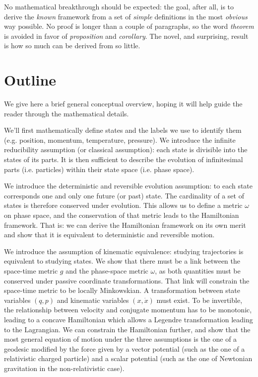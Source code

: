 \documentclass[aps,pra,10pt,twocolumn,floatfix,nofootinbib]{revtex4-1}
\theoremstyle{definition}
\begin{document}
No mathematical breakthrough should be expected: the goal, after all, is to derive the \emph{known} framework from a set of \emph{simple} definitions in the most \emph{obvious} way possible. No proof is longer than a couple of paragraphs, so the word \emph{theorem} is avoided in favor of \emph{proposition} and \emph{corollary}. The novel, and surprising, result is how so much can be derived from so little.

\section{Outline}

We give here a brief general conceptual overview, hoping it will help guide the reader through the mathematical details.

We'll first mathematically define states and the labels we use to identify them (e.g. position, momentum, temperature, pressure). We introduce the infinite reducibility assumption (or classical assumption): each state is divisible into the states of its parts. It is then sufficient to describe the evolution of infinitesimal parts (i.e. particles) within their state space (i.e. phase space).

We introduce the deterministic and reversible evolution assumption: to each state corresponds one and only one future (or past) state. The cardinality of a set of states is therefore conserved under evolution. This allows us to define a metric $\omega$ on phase space, and the conservation of that metric leads to the Hamiltonian framework. That is: we can derive the Hamiltonian framework on its own merit and show that it is equivalent to deterministic and reversible motion.

We introduce the assumption of kinematic equivalence: studying trajectories is equivalent to studying states. We show that there must be a link between the space-time metric $g$ and the phase-space metric $\omega$, as both quantities must be conserved under passive coordinate transformations. That link will constrain the space-time metric to be locally Minkowskian. A transformation between state variables $(q, p)$ and kinematic variables $(x, \dot{x})$ must exist.  To be invertible, the relationship between velocity and conjugate momentum has to be monotonic, leading to a concave Hamiltonian which allows a Legendre transformation leading to the Lagrangian. We can constrain the Hamiltonian further, and show that the most general equation of motion under the three assumptions is the one of a geodesic modified by the force given by a vector potential (such as the one of a relativistic charged particle) and a scalar potential (such as the one of Newtonian gravitation in the non-relativistic case).
\end{document}
